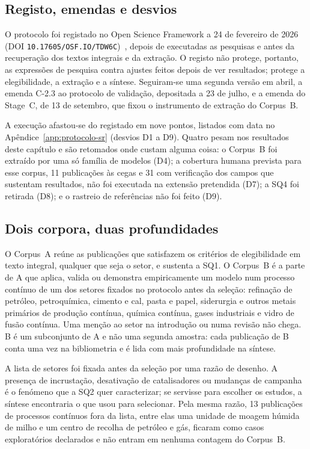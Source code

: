 \subsection{Registo, emendas e desvios}

O protocolo foi registado no Open Science Framework a 24 de fevereiro de
2026 (DOI \nolinkurl{10.17605/OSF.IO/TDW6C})~\cite{Ribeiro2026Protocolo},
depois de executadas as pesquisas e antes da recuperação dos textos
integrais e da extração. O registo não protege, portanto, as expressões de
pesquisa contra ajustes feitos depois de ver resultados; protege a
elegibilidade, a extração e a síntese. Seguiram-se uma segunda versão em
abril, a emenda C-2.3 ao protocolo de validação, depositada a 23 de julho,
e a emenda do Stage~C, de 13 de setembro, que fixou o instrumento de
extração do Corpus~B.

A execução afastou-se do registado em nove pontos, listados com data no
Apêndice~\ref{app:protocolo-sr} (desvios D1 a D9). Quatro pesam nos
resultados deste capítulo e são retomados onde custam alguma coisa: o
Corpus~B foi extraído por uma só família de modelos (D4); a cobertura
humana prevista para esse corpus, 11 publicações às cegas e 31 com
verificação dos campos que sustentam resultados, não foi executada na extensão pretendida (D7);
a SQ4 foi retirada (D8); e o rastreio de referências não foi feito (D9).

\subsection{Dois corpora, duas profundidades}
\label{sec:dois-corpora}

O Corpus~A reúne as publicações que satisfazem os critérios de
elegibilidade em texto integral, qualquer que seja o setor, e sustenta a
SQ1. O Corpus~B é a parte de A que aplica, valida ou demonstra
empiricamente um modelo num processo contínuo de um dos setores fixados
no protocolo antes da seleção: refinação de petróleo, petroquímica,
cimento e cal, pasta e papel, siderurgia e outros metais primários de
produção contínua, química contínua, gases industriais e vidro de fusão
contínua. Uma menção ao setor na introdução ou numa revisão não chega.
B é um subconjunto de A e não uma segunda amostra: cada publicação de B
conta uma vez na bibliometria e é lida com mais profundidade na síntese.

A lista de setores foi fixada antes da seleção por uma razão de desenho.
A presença de incrustação, desativação de catalisadores ou mudanças de
campanha é o fenómeno que a SQ2 quer caracterizar; se servisse para
escolher os estudos, a síntese encontraria o que usou para selecionar.
Pela mesma razão, 13 publicações de processos contínuos fora da lista,
entre elas uma unidade de moagem húmida de milho e um centro de recolha
de petróleo e gás, ficaram como casos exploratórios declarados e não
entram em nenhuma contagem do Corpus~B.

